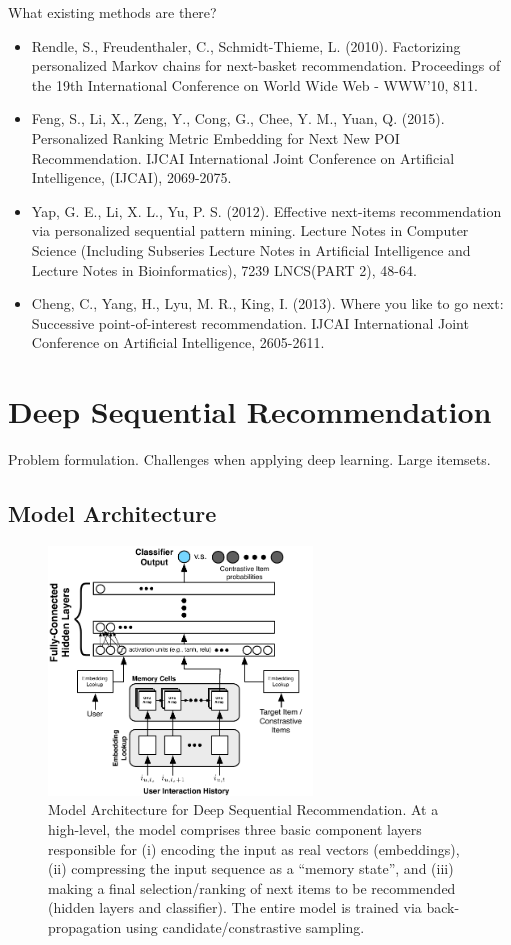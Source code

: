 \documentclass{sig-alternate-05-2015}
\begin{document}
What existing methods are there?
\begin{itemize}
\item Rendle, S., Freudenthaler, C., Schmidt-Thieme, L. (2010). Factorizing personalized Markov chains for next-basket recommendation. Proceedings of the 19th International Conference on World Wide Web - WWW'10, 811.
\item Feng, S., Li, X., Zeng, Y., Cong, G., Chee, Y. M., Yuan, Q. (2015). Personalized Ranking Metric Embedding for Next New POI Recommendation. IJCAI International Joint Conference on Artificial Intelligence, (IJCAI), 2069-2075.
\item Yap, G. E., Li, X. L., Yu, P. S. (2012). Effective next-items recommendation via personalized sequential pattern mining. Lecture Notes in Computer Science (Including Subseries Lecture Notes in Artificial Intelligence and Lecture Notes in Bioinformatics), 7239 LNCS(PART 2), 48-64.
\item Cheng, C., Yang, H., Lyu, M. R., King, I. (2013). Where you like to go next: Successive point-of-interest recommendation. IJCAI International Joint Conference on Artificial Intelligence, 2605-2611.
\end{itemize}
 
\section{Deep Sequential Recommendation}

Problem formulation. Challenges when applying deep learning. Large itemsets. 

\subsection{Model Architecture}

\begin{figure}
\centering
	\includegraphics[width=7cm]{images/ModelArch}
	\caption{Model Architecture for Deep Sequential Recommendation. At a high-level, the model comprises three basic component layers responsible for (i) encoding the input as real vectors (embeddings), (ii) compressing the input sequence as a ``memory state'', and (iii) making a final selection/ranking of next items to be recommended (hidden layers and classifier). The entire model is trained via back-propagation using candidate/constrastive sampling.}
	\label{fig:ModelArch}
\end{figure}
\end{document}
